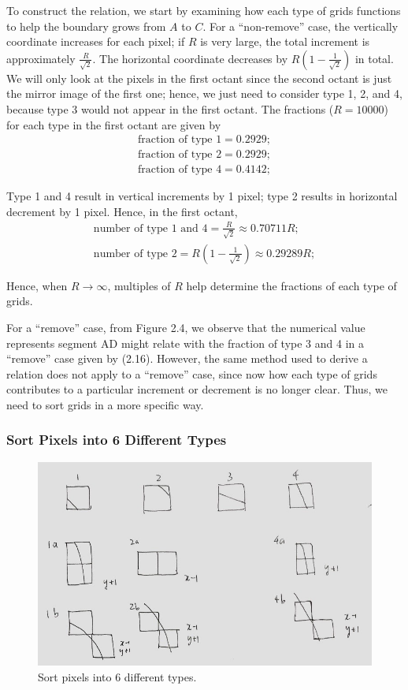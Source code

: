 \documentclass[letterpaper]{article}
\numberwithin{equation}{section} %
\numberwithin{figure}{section} %
\numberwithin{table}{section} %
\begin{document}
\noindent
To construct the relation, we start by examining how each type of grids functions to help the boundary grows from $A$ to $C$. For a \enquote{non-remove} case, the vertically coordinate increases for each pixel; if $R$ is very large, the total increment is approximately $\frac{R}{\sqrt{2}}$. The horizontal coordinate decreases by $R(1-\frac{1}{\sqrt{2}})$ in total. We will only look at the pixels in the first octant since the second octant is just the mirror image of the first one; hence, we just need to consider type 1, 2, and 4, because type 3 would not appear in the first octant. The fractions ($R=10000$) for each type in the first octant are given by 
\begin{align} 
\text{fraction of type 1} = 0.2929;\\
\text{fraction of type 2} = 0.2929;\\
\text{fraction of type 4} = 0.4142;
\end{align}

\noindent
Type 1 and 4 result in vertical increments by 1 pixel; type 2 results in horizontal decrement by 1 pixel. Hence, in the first octant, 
\begin{align} 
\text{number of type 1 and 4}=\frac{R}{\sqrt{2}} \approx 0.70711R;\\
\text{number of type 2}=R(1-\frac{1}{\sqrt{2}}) \approx 0.29289R;
\end{align}

\noindent
Hence, when $R \rightarrow \infty$, multiples of $R$ help determine the fractions of each type of grids. 



For a \enquote{remove} case, from Figure 2.4, we observe that the numerical value represents segment AD might relate with the fraction of type 3 and 4 in a \enquote{remove} case given by (2.16). However, the same method used to derive a relation does not apply to a \enquote{remove} case, since now how each type of grids contributes to a particular increment or decrement is no longer clear. Thus, we need to sort grids in a more specific way. 



\subsubsection{Sort Pixels into 6 Different Types}

\begin{figure}[h]
	\centering
	\includegraphics[width=0.5\linewidth]{6ty}
	\caption{Sort pixels into 6 different types.}
	\label{fig:6ty}
\end{figure}
\end{document}
